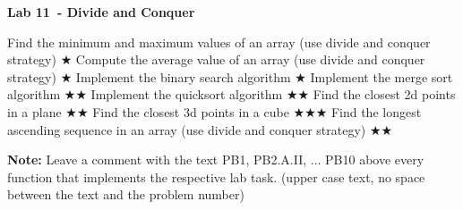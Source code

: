 \documentclass{exam}
\newcommand\labnr{11}
\newcommand\lab{Lab \labnr\ - Divide and Conquer}
\newcommand\lvlez{$\bigstar$}
\newcommand\lvlmed{\lvlez\lvlez}
\newcommand\lvlhard{\lvlmed\lvlez}
\begin{document}
\begin{center}
    \vspace*{0cm}
    \bfseries\LARGE
    \lab
    \vspace*{1cm}
\end{center}


\begin{questions}
    \question Find the minimum and maximum values of an array (use divide and conquer strategy) \lvlez
    \question Compute the average value of an array (use divide and conquer strategy) \lvlez
    \question Implement the binary search algorithm \lvlez
    \question Implement the merge sort algorithm \lvlmed
    \question Implement the quicksort algorithm \lvlmed
    \question Find the closest 2d points in a plane \lvlmed
    \question Find the closest 3d points in a cube \lvlhard
    \question Find the longest ascending sequence in an array (use divide and conquer strategy) \lvlmed
\end{questions}

 \bigskip
\textbf{Note:} Leave a comment with the text PB1, PB2.A.II, ... PB10 above every function that implements the respective lab task. (upper case text, no space between the text and the problem number)

\medskip
\printbibliography
\end{document}
